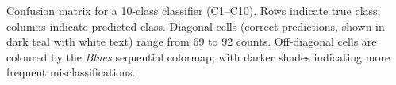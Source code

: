 \caption{Confusion matrix for a 10-class classifier (C1--C10). Rows indicate true class; columns indicate predicted class. Diagonal cells (correct predictions, shown in dark teal with white text) range from 69 to 92 counts. Off-diagonal cells are coloured by the \textit{Blues} sequential colormap, with darker shades indicating more frequent misclassifications.}
